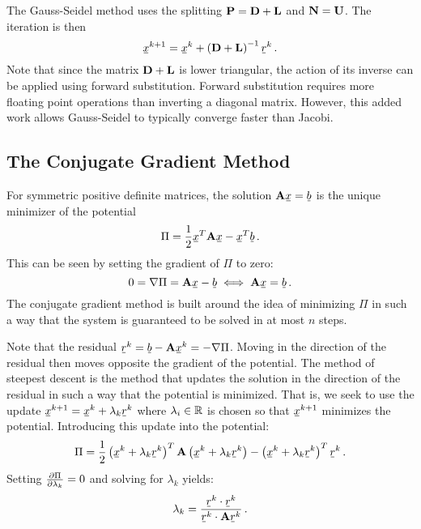 \documentclass[../doc.tex]{subfiles}
\begin{document}
The Gauss-Seidel method uses the splitting $\boldsymbol{\mathrm{P}} = \boldsymbol{\mathrm{D}} + \boldsymbol{\mathrm{L}}$ and $\boldsymbol{\mathrm{N}} = \boldsymbol{\mathrm{U}}$. The iteration is then 
	\begin{equation}
		\ubar{x}^{k+1} = \ubar{x}^k + \paren{\mat{D} + \mat{L}}^{-1} \ubar{r}^k \,. 
	\end{equation}
Note that since the matrix $\boldsymbol{\mathrm{D}} + \boldsymbol{\mathrm{L}}$ is lower triangular, the action of its inverse can be applied using forward substitution. Forward substitution requires more floating point operations than inverting a diagonal matrix. However, this added work allows Gauss-Seidel to typically converge faster than Jacobi. 

\subsection{The Conjugate Gradient Method}
For symmetric positive definite matrices, the solution $\mat{A}\ubar{x} = \ubar{b}$ is the unique minimizer of the potential 
	\begin{equation}
		\Pi = \frac{1}{2} \ubar{x}^T \mat{A} \ubar{x} - \ubar{x}^T \ubar{b} \,. 
	\end{equation}
This can be seen by setting the gradient of $\Pi$ to zero: 
	\begin{equation}
		0 = \nabla \Pi = \mat{A} \ubar{x} - \ubar{b} \iff \mat{A} \ubar{x} = \ubar{b} \,. 
	\end{equation}
The conjugate gradient method \cite{cg_hs,cgh} is built around the idea of minimizing $\Pi$ in such a way that the system is guaranteed to be solved in at most $n$ steps.

Note that the residual $\ubar{r}^k = \ubar{b} - \mat{A}\ubar{x}^k = -\nabla\Pi$. Moving in the direction of the residual then moves opposite the gradient of the potential. The method of steepest descent is the method that updates the solution in the direction of the residual in such a way that the potential is minimized. That is, we seek to use the update $\ubar{x}^{k+1} = \ubar{x}^k + \lambda_k \ubar{r}^k$ where $\lambda_i \in \mathbb{R}$ is chosen so that $\ubar{x}^{k+1}$ minimizes the potential. Introducing this update into the potential: 
	\begin{equation}
		\Pi = \frac{1}{2}\paren{\ubar{x}^k + \lambda_k \ubar{r}^k}^T \mat{A}\paren{\ubar{x}^k + \lambda_k \ubar{r}^k} - \paren{\ubar{x}^k + \lambda_k \ubar{r}^k}^T \ubar{r}^k \,. 
	\end{equation}
Setting $\frac{\partial \Pi}{\partial \lambda_k} = 0$ and solving for $\lambda_k$ yields: 
	\begin{equation}
		\lambda_k = \frac{\ubar{r}^k \cdot \ubar{r}^k}{\ubar{r}^k \cdot \mat{A} \ubar{r}^k} \,. 
	\end{equation}
\end{document}
